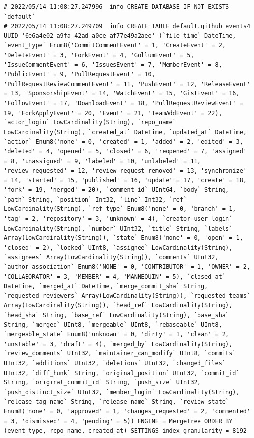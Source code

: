 \begin{verbatim}
# 2022/05/14 11:08:27.247996  info CREATE DATABASE IF NOT EXISTS `default`
# 2022/05/14 11:08:27.249709  info CREATE TABLE default.github_events4 UUID '6e6a4e02-a9fa-42ad-a0ce-af77e49a2aee' (`file_time` DateTime, `event_type` Enum8('CommitCommentEvent' = 1, 'CreateEvent' = 2, 'DeleteEvent' = 3, 'ForkEvent' = 4, 'GollumEvent' = 5, 'IssueCommentEvent' = 6, 'IssuesEvent' = 7, 'MemberEvent' = 8, 'PublicEvent' = 9, 'PullRequestEvent' = 10, 'PullRequestReviewCommentEvent' = 11, 'PushEvent' = 12, 'ReleaseEvent' = 13, 'SponsorshipEvent' = 14, 'WatchEvent' = 15, 'GistEvent' = 16, 'FollowEvent' = 17, 'DownloadEvent' = 18, 'PullRequestReviewEvent' = 19, 'ForkApplyEvent' = 20, 'Event' = 21, 'TeamAddEvent' = 22), `actor_login` LowCardinality(String), `repo_name` LowCardinality(String), `created_at` DateTime, `updated_at` DateTime, `action` Enum8('none' = 0, 'created' = 1, 'added' = 2, 'edited' = 3, 'deleted' = 4, 'opened' = 5, 'closed' = 6, 'reopened' = 7, 'assigned' = 8, 'unassigned' = 9, 'labeled' = 10, 'unlabeled' = 11, 'review_requested' = 12, 'review_request_removed' = 13, 'synchronize' = 14, 'started' = 15, 'published' = 16, 'update' = 17, 'create' = 18, 'fork' = 19, 'merged' = 20), `comment_id` UInt64, `body` String, `path` String, `position` Int32, `line` Int32, `ref` LowCardinality(String), `ref_type` Enum8('none' = 0, 'branch' = 1, 'tag' = 2, 'repository' = 3, 'unknown' = 4), `creator_user_login` LowCardinality(String), `number` UInt32, `title` String, `labels` Array(LowCardinality(String)), `state` Enum8('none' = 0, 'open' = 1, 'closed' = 2), `locked` UInt8, `assignee` LowCardinality(String), `assignees` Array(LowCardinality(String)), `comments` UInt32, `author_association` Enum8('NONE' = 0, 'CONTRIBUTOR' = 1, 'OWNER' = 2, 'COLLABORATOR' = 3, 'MEMBER' = 4, 'MANNEQUIN' = 5), `closed_at` DateTime, `merged_at` DateTime, `merge_commit_sha` String, `requested_reviewers` Array(LowCardinality(String)), `requested_teams` Array(LowCardinality(String)), `head_ref` LowCardinality(String), `head_sha` String, `base_ref` LowCardinality(String), `base_sha` String, `merged` UInt8, `mergeable` UInt8, `rebaseable` UInt8, `mergeable_state` Enum8('unknown' = 0, 'dirty' = 1, 'clean' = 2, 'unstable' = 3, 'draft' = 4), `merged_by` LowCardinality(String), `review_comments` UInt32, `maintainer_can_modify` UInt8, `commits` UInt32, `additions` UInt32, `deletions` UInt32, `changed_files` UInt32, `diff_hunk` String, `original_position` UInt32, `commit_id` String, `original_commit_id` String, `push_size` UInt32, `push_distinct_size` UInt32, `member_login` LowCardinality(String), `release_tag_name` String, `release_name` String, `review_state` Enum8('none' = 0, 'approved' = 1, 'changes_requested' = 2, 'commented' = 3, 'dismissed' = 4, 'pending' = 5)) ENGINE = MergeTree ORDER BY (event_type, repo_name, created_at) SETTINGS index_granularity = 8192

\end{verbatim}
